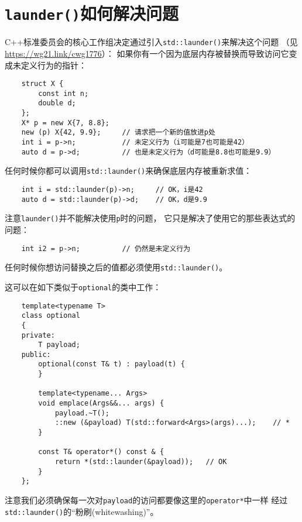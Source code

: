 \section{\texttt{launder()}如何解决问题}
C++标准委员会的核心工作组决定通过引入\texttt{std::launder()}来解决这个问题
（见\url{https://wg21.link/cwg1776}）：
如果你有一个因为底层内存被替换而导致访问它变成未定义行为的指针：
\begin{lstlisting}
    struct X {
        const int n;
        double d;
    };
    X* p = new X{7, 8.8};
    new (p) X{42, 9.9};     // 请求把一个新的值放进p处
    int i = p->n;           // 未定义行为（i可能是7也可能是42）
    auto d = p->d;          // 也是未定义行为（d可能是8.8也可能是9.9）
\end{lstlisting}
任何时候你都可以调用\texttt{std::launder()}来确保底层内存被重新求值：
\begin{lstlisting}
    int i = std::launder(p)->n;     // OK，i是42
    auto d = std::launder(p)->d;    // OK，d是9.9
\end{lstlisting}
注意\texttt{launder()}并不能解决使用\texttt{p}时的问题，
它只是解决了使用它的那些表达式的问题：
\begin{lstlisting}
    int i2 = p->n;          // 仍然是未定义行为
\end{lstlisting}
任何时候你想访问替换之后的值都必须使用\texttt{std::launder()}。

这可以在如下类似于\texttt{optional}的类中工作：
\begin{lstlisting}
    template<typename T>
    class optional
    {
    private:
        T payload;
    public:
        optional(const T& t) : payload(t) {
        }

        template<typename... Args>
        void emplace(Args&&... args) {
            payload.~T();
            ::new (&payload) T(std::forward<Args>(args)...);    // *
        }

        const T& operator*() const & {
            return *(std::launder(&payload));   // OK
        }
    };
\end{lstlisting}
注意我们必须确保每一次对\texttt{payload}的访问都要像这里的\texttt{operator*}中一样
经过\texttt{std::launder()}的“粉刷(whitewashing)”。


